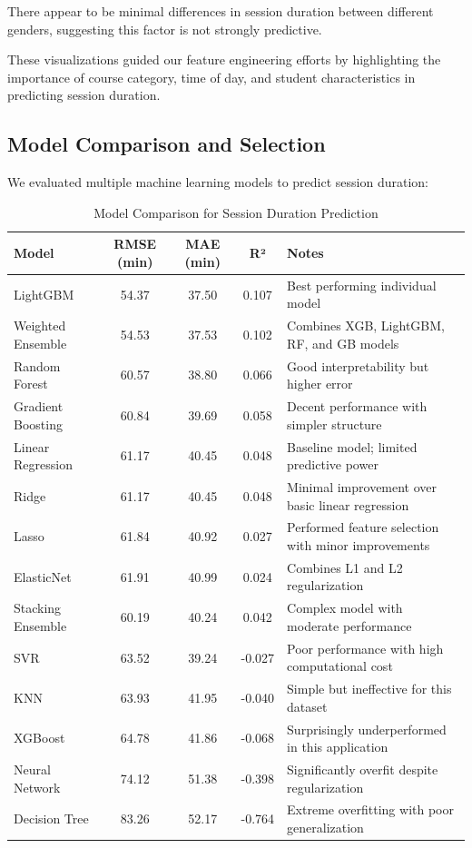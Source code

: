 \documentclass[12pt,letterpaper]{article}
\begin{document}
There appear to be minimal differences in session duration between different genders, suggesting this factor is not strongly predictive.

These visualizations guided our feature engineering efforts by highlighting the importance of course category, time of day, and student characteristics in predicting session duration.

\subsection{Model Comparison and Selection}

We evaluated multiple machine learning models to predict session duration:

\begin{table}[H]
\centering
\begin{tabular}{lccc|l}
\toprule
\textbf{Model} & \textbf{RMSE (min)} & \textbf{MAE (min)} & \textbf{R²} & \textbf{Notes} \\
\midrule
LightGBM & 54.37 & 37.50 & 0.107 & Best performing individual model \\
Weighted Ensemble & 54.53 & 37.53 & 0.102 & Combines XGB, LightGBM, RF, and GB models \\
Random Forest & 60.57 & 38.80 & 0.066 & Good interpretability but higher error \\
Gradient Boosting & 60.84 & 39.69 & 0.058 & Decent performance with simpler structure \\
Linear Regression & 61.17 & 40.45 & 0.048 & Baseline model; limited predictive power \\
Ridge & 61.17 & 40.45 & 0.048 & Minimal improvement over basic linear regression \\
Lasso & 61.84 & 40.92 & 0.027 & Performed feature selection with minor improvements \\
ElasticNet & 61.91 & 40.99 & 0.024 & Combines L1 and L2 regularization \\
Stacking Ensemble & 60.19 & 40.24 & 0.042 & Complex model with moderate performance \\
SVR & 63.52 & 39.24 & -0.027 & Poor performance with high computational cost \\
KNN & 63.93 & 41.95 & -0.040 & Simple but ineffective for this dataset \\
XGBoost & 64.78 & 41.86 & -0.068 & Surprisingly underperformed in this application \\
Neural Network & 74.12 & 51.38 & -0.398 & Significantly overfit despite regularization \\
Decision Tree & 83.26 & 52.17 & -0.764 & Extreme overfitting with poor generalization \\
\bottomrule
\end{tabular}
\caption{Model Comparison for Session Duration Prediction}
\end{table}
\end{document}
